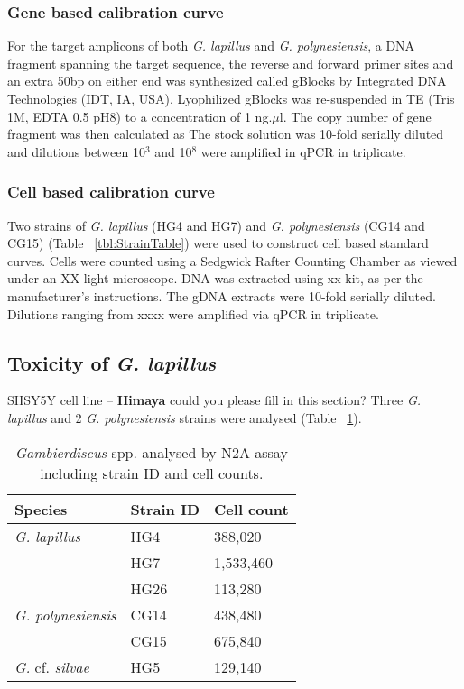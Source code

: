 \documentclass[12pt]{article}
\begin{document}
\subsubsection*{Gene based calibration curve}
For the target amplicons of both \emph{G. lapillus} and \emph{G. polynesiensis}, a DNA fragment spanning the target sequence, the reverse and forward primer sites and an extra 50bp on either end was synthesized called gBlocks \textsuperscript{\textregistered} by Integrated DNA Technologies (IDT, IA, USA). Lyophilized gBlocks \textsuperscript{\textregistered} was re-suspended in TE (Tris 1M, EDTA 0.5 pH8) to a concentration of 1 ng.$\mu$l. The copy number of gene fragment was then calculated as 
The stock solution was 10-fold serially diluted and dilutions between 10$^{3}$ and 10$^{8}$ were amplified in qPCR in triplicate.


\subsubsection*{Cell based calibration curve}
Two strains of \emph{G. lapillus} (HG4 and HG7) and \emph{G. polynesiensis} (CG14 and CG15) (Table ~\ref{tbl:StrainTable}) were used to construct cell based standard curves. Cells were counted using a Sedgwick Rafter Counting Chamber as viewed under an XX light microscope. DNA was extracted using xx kit, as per the manufacturer's instructions. The gDNA extracts were 10-fold serially diluted. Dilutions ranging from xxxx were amplified via qPCR in triplicate.
\subsection*{Toxicity of \emph{G. lapillus}}
SHSY5Y cell line -- \textbf{Himaya} could you please fill in this section?
Three \emph{G. lapillus} and 2 \emph{G. polynesiensis} strains were analysed (Table ~\ref{tbl:N2ATable}).
\FloatBarrier
\begin{table}
\caption{\emph{Gambierdiscus} spp. analysed by N2A assay including strain ID and cell counts.}
\label{tbl:N2ATable}
\begin{tabular}{ | p{4cm} | p{3cm} | p{2cm} | }
\hline
\textbf{Species} & \textbf{Strain ID}& \textbf{Cell count} \\
\hline
\emph{G. lapillus}&HG4&388,020\\
\hline
&HG7&1,533,460\\
\hline
&HG26&113,280\\
\hline
\emph{G. polynesiensis}&CG14&438,480\\
\hline
&CG15&675,840\\
\hline
\emph{G.} cf. \emph{silvae}&HG5&129,140\\
\hline
\end{tabular}
\end{table}
\FloatBarrier
\end{document}
